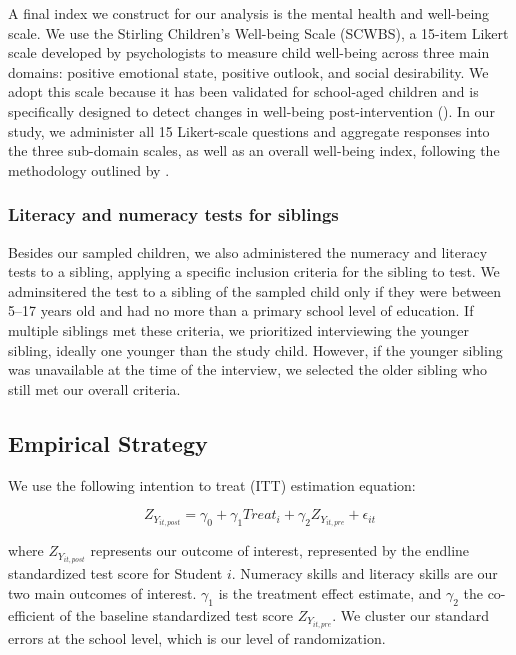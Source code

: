 \documentclass[hidelinks,12pt]{article}
\begin{document}
\begin{singlespace}
A final index we construct for our analysis is the mental health and well-being scale. We use the Stirling Children’s Well-being Scale (SCWBS), a 15-item Likert scale developed by psychologists to measure child well-being across three main domains: positive emotional state, positive outlook, and social desirability. We adopt this scale because it has been validated for school-aged children and is specifically designed to detect changes in well-being post-intervention (\cite{liddle_emotional_2015}). In our study, we administer all 15 Likert-scale questions and aggregate responses into the three sub-domain scales, as well as an overall well-being index, following the methodology outlined by \textcite{liddle_emotional_2015}.

\subsubsection{Literacy and numeracy tests for siblings}\label{subsec:sibling_selection}
Besides our sampled children, we also administered the numeracy and literacy tests to a sibling, applying a specific inclusion criteria for the sibling to test. We adminsitered the test to a sibling of the sampled child only if they were between 5–17 years old and had no more than a primary school level of education. If multiple siblings met these criteria, we prioritized interviewing the younger sibling, ideally one younger than the study child. However, if the younger sibling was unavailable at the time of the interview, we selected the older sibling who still met our overall criteria. 

\subsection{Empirical Strategy}\label{subsec:empirical_strategy}
We use the following intention to treat (ITT) estimation equation:

\begin{equation}\label{eq_1}
Z_{Y_{it, post}} = \gamma_0 + \gamma_1 Treat_i + \gamma_2 Z_{Y_{it, pre}} + \epsilon_{it}
\end{equation}

where $Z_{Y_{it, post}}$ represents our outcome of interest, represented by the endline standardized test score for Student $i$. Numeracy skills and literacy skills are our two main outcomes of interest. $\gamma_1$ is the treatment effect estimate, and $\gamma_2$ the co-efficient of the baseline standardized test score $Z_{Y_{it, pre}}$. We cluster our standard errors at the school level, which is our level of randomization.


\end{singlespace}
\end{document}
